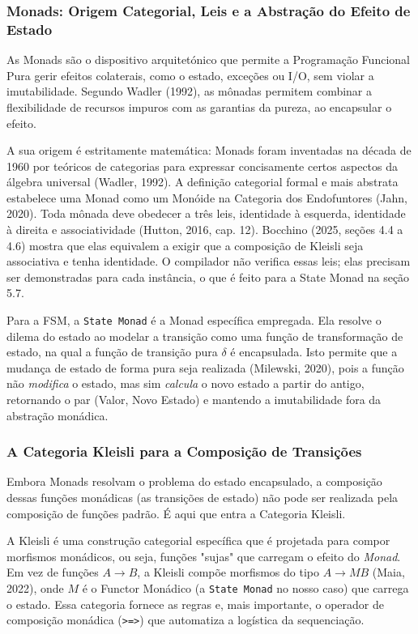 \documentclass[12pt,a4paper]{article}
\begin{document}
\subsubsection{Monads: Origem Categorial, Leis e a Abstração do Efeito de Estado}

As Monads são o dispositivo arquitetónico que permite a Programação Funcional Pura gerir efeitos colaterais, como o estado, exceções ou I/O, sem violar a imutabilidade. Segundo Wadler (1992), as mônadas permitem combinar a flexibilidade de recursos impuros com as garantias da pureza, ao encapsular o efeito.

A sua origem é estritamente matemática: Monads foram inventadas na década de 1960 por teóricos de categorias para expressar concisamente certos aspectos da álgebra universal (Wadler, 1992). A definição categorial formal e mais abstrata estabelece uma Monad como um Monóide na Categoria dos Endofuntores (Jahn, 2020). Toda mônada deve obedecer a três leis, identidade à esquerda, identidade à direita e associatividade (Hutton, 2016, cap. 12). Bocchino (2025, seções 4.4 a 4.6) mostra que elas equivalem a exigir que a composição de Kleisli seja associativa e tenha identidade. O compilador não verifica essas leis; elas precisam ser demonstradas para cada instância, o que é feito para a State Monad na seção 5.7.

Para a FSM, a \texttt{State Monad} é a Monad específica empregada. Ela resolve o dilema do estado ao modelar a transição como uma função de transformação de estado, na qual a função de transição pura $\delta$ é encapsulada. Isto permite que a mudança de estado de forma pura seja realizada (Milewski, 2020), pois a função não \textit{modifica} o estado, mas sim \textit{calcula} o novo estado a partir do antigo, retornando o par (Valor, Novo Estado) e mantendo a imutabilidade fora da abstração monádica.

\subsubsection{A Categoria Kleisli para a Composição de Transições}

Embora Monads resolvam o problema do estado encapsulado, a composição dessas funções monádicas (as transições de estado) não pode ser realizada pela composição de funções padrão. É aqui que entra a Categoria Kleisli.

A Kleisli é uma construção categorial específica que é projetada para compor morfismos monádicos, ou seja, funções "sujas" que carregam o efeito do \textit{Monad}. Em vez de funções $A \to B$, a Kleisli compõe morfismos do tipo $A \to MB$ (Maia, 2022), onde $M$ é o Functor Monádico (a \texttt{State Monad} no nosso caso) que carrega o estado. Essa categoria fornece as regras e, mais importante, o operador de composição monádica (\texttt{>=>}) que automatiza a logística da sequenciação.
\end{document}
